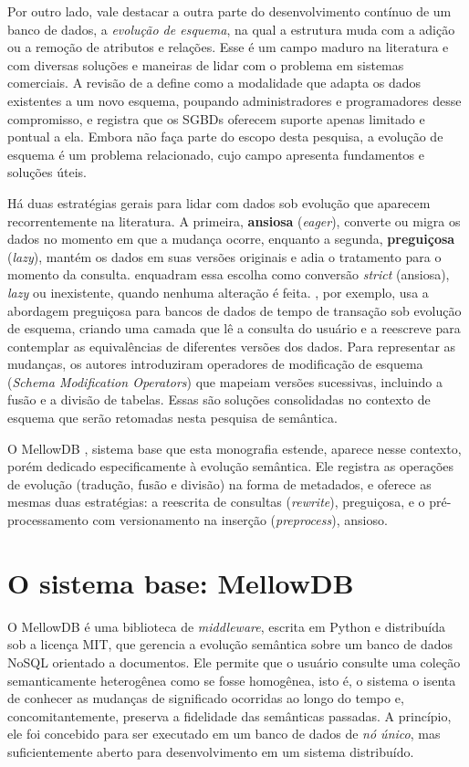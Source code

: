 Por outro lado, vale destacar a outra parte do desenvolvimento contínuo de um banco de dados, a \textit{evolução de esquema}, na qual a estrutura muda com a adição ou a remoção de atributos e relações. Esse é um campo maduro na literatura e com diversas soluções e maneiras de lidar com o problema em sistemas comerciais. A revisão de \citet{brahmia2024} a define como a modalidade que adapta os dados existentes a um novo esquema, poupando administradores e programadores desse compromisso, e registra que os SGBDs oferecem suporte apenas limitado e pontual a ela. Embora não faça parte do escopo desta pesquisa, a evolução de esquema é um problema relacionado, cujo campo apresenta fundamentos e soluções úteis.

Há duas estratégias gerais para lidar com dados sob evolução que aparecem recorrentemente na literatura. A primeira, \textbf{ansiosa} (\textit{eager}), converte ou migra os dados no momento em que a mudança ocorre, enquanto a segunda, \textbf{preguiçosa} (\textit{lazy}), mantém os dados em suas versões originais e adia o tratamento para o momento da consulta. \citet{devries2004} enquadram essa escolha como conversão \textit{strict} (ansiosa), \textit{lazy} ou inexistente, quando nenhuma alteração é feita. \citet{moon2008}, por exemplo, usa a abordagem preguiçosa para bancos de dados de tempo de transação sob evolução de esquema, criando uma camada que lê a consulta do usuário e a reescreve para contemplar as equivalências de diferentes versões dos dados. Para representar as mudanças, os autores introduziram operadores de modificação de esquema (\textit{Schema Modification Operators}) que mapeiam versões sucessivas, incluindo a fusão e a divisão de tabelas. Essas são soluções consolidadas no contexto de esquema que serão retomadas nesta pesquisa de semântica.

O MellowDB \citep{nepomuceno2026}, sistema base que esta monografia estende, aparece nesse contexto, porém dedicado especificamente à evolução semântica. Ele registra as operações de evolução (tradução, fusão e divisão) na forma de metadados, e oferece as mesmas duas estratégias: a reescrita de consultas (\textit{rewrite}), preguiçosa, e o pré-processamento com versionamento na inserção (\textit{preprocess}), ansioso.

\section{O sistema base: MellowDB}
\label{sec:mellowdb}

O MellowDB \citep{nepomuceno2026} é uma biblioteca de \textit{middleware}, escrita em Python e distribuída sob a licença MIT, que gerencia a evolução semântica sobre um banco de dados NoSQL orientado a documentos. Ele permite que o usuário consulte uma coleção semanticamente heterogênea como se fosse homogênea, isto é, o sistema o isenta de conhecer as mudanças de significado ocorridas ao longo do tempo e, concomitantemente, preserva a fidelidade das semânticas passadas. A princípio, ele foi concebido para ser executado em um banco de dados de \textit{nó único}, mas suficientemente aberto para desenvolvimento em um sistema distribuído.

